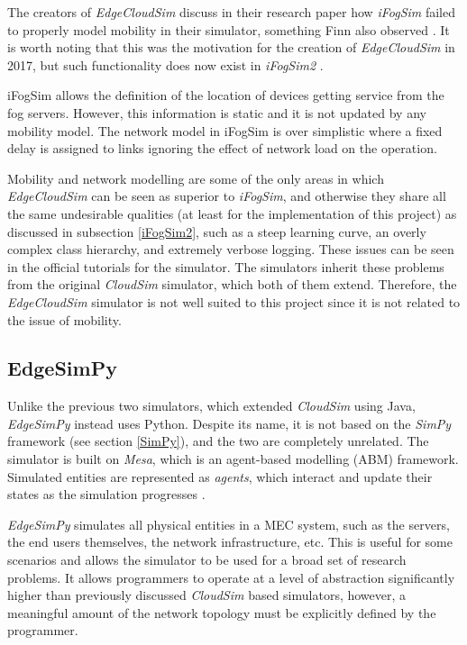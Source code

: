 \documentclass[]{UCD_CS_Interim_Report}
\renewenvironment{leftbar}{%
    \def\FrameCommand{%
        {\color{gray}\vrule width 1pt}%
        \hspace{12pt}%
    }%
    \MakeFramed{%
        \advance\hsize-\width
        \FrameRestore
        \setlength{\parskip}{0pt}%
    }%
    \itshape
    \vspace{8pt}%
}{%
    \par\vspace{8pt}%
    \endMakeFramed
    \vspace{-\parskip}%
}
\begin{document}
The creators of \textit{EdgeCloudSim} discuss in their research paper how \textit{iFogSim} failed to properly model mobility in their simulator, something Finn also observed \cite{finn2026hepa}. It is worth noting that this was the motivation for the creation of \textit{EdgeCloudSim} in 2017, but such functionality does now exist in \textit{iFogSim2} \cite{ifogsim}.

\begin{leftbar}
     iFogSim allows the definition of the location of devices getting service from the fog servers. However, this information is static and it is not updated by any mobility model. The network model in iFogSim is over simplistic where a fixed delay is assigned to links ignoring the effect of network load on the operation. \cite{edgecloudsim2017}
\end{leftbar}

Mobility and network modelling are some of the only areas in which \textit{EdgeCloudSim} can be seen as superior to \textit{iFogSim}, and otherwise they share all the same  undesirable qualities (at least for the implementation of this project) as discussed in subsection \ref{iFogSim2}, such as a steep learning curve, an overly complex class hierarchy, and extremely verbose logging. These issues can be seen in the official tutorials for the simulator. The simulators inherit these problems from the original \textit{CloudSim} simulator, which both of them extend. Therefore, the \textit{EdgeCloudSim} simulator is not well suited to this project since it is not related to the issue of mobility.

\subsection{EdgeSimPy} \label{EdgeSimPy}
Unlike the previous two simulators, which extended \textit{CloudSim} using Java, \textit{EdgeSimPy} \cite{edgesimpy2023} instead uses Python. Despite its name, it is not based on the \textit{SimPy} framework (see section \ref{SimPy}), and the two are completely unrelated. The simulator is built on \textit{Mesa}, which is an agent-based modelling (ABM) framework. Simulated entities are represented as \textit{agents}, which interact and update their states as the simulation progresses \cite{mesa}.

\textit{EdgeSimPy} simulates all physical entities in a MEC system, such as the servers, the end users themselves, the network infrastructure, etc. This is useful for some scenarios and allows the simulator to be used for a broad set of research problems. It allows programmers to operate at a level of abstraction significantly higher than previously discussed \textit{CloudSim} based simulators, however, a meaningful amount of the network topology must be explicitly defined by the programmer.
\end{document}
